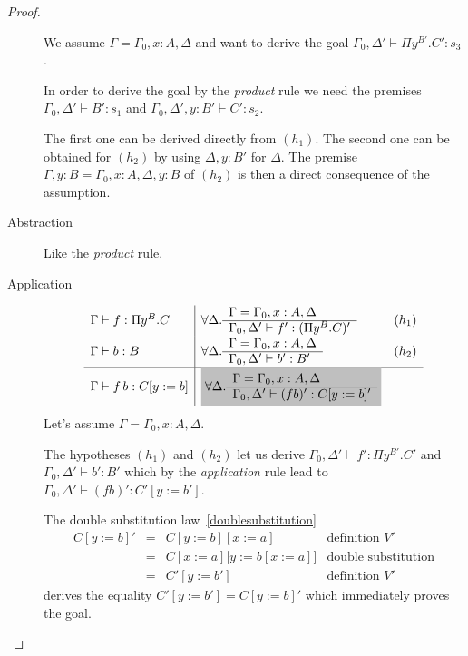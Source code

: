 \begin{theorem}
\begin{proof}
\begin{description}
      We assume $\Gamma = \Gamma_0,x:A,\Delta$ and want to derive the goal
      $\Gamma_0,\Delta' \vdash \Pi y^{B'}. C' : s_3$.

      In order to derive the goal by the \emph{product} rule we need the
      premises $\Gamma_0,\Delta' \vdash B': s_1$ and
      $\Gamma_0,\Delta',y:B' \vdash C': s_2$.

      The first one can be derived directly from $(h_1)$. The second one can
      be obtained for $(h_2)$ by using $\Delta,y:B'$ for $\Delta$. The premise
      $\Gamma,y:B = \Gamma_0,x:A,\Delta,y:B$ of $(h_2)$ is then a direct
      consequence of the assumption.

    \item[Abstraction] Like the \emph{product} rule.

    \item[Application]
      $$
      \begin{array}{l|ll}
        \Gamma\vdash f: \Pi y^B.C
        &\forall \Delta .
          \rulev
          {\Gamma = \Gamma_0,x:A,\Delta}
          {\Gamma_0,\Delta' \vdash f': (\Pi y^B.C)'} & (h_1)
        \\
        \Gamma \vdash b: B
        &\forall \Delta .
          \rulev
          {\Gamma = \Gamma_0,x:A,\Delta}
          {\Gamma_0,\Delta' \vdash b': B'} & (h_2)
        \\
        \hline %
        \Gamma \vdash f\, b : C[y:=b]
        & \goalbg{
          \forall \Delta .
          \rulev
          {\Gamma = \Gamma_0,x:A,\Delta}
          {\Gamma_0,\Delta' \vdash (f b)': C[y:=b]'}
          }
      \end{array}
      $$
      Let's assume $\Gamma = \Gamma_0,x:A,\Delta$.

      The hypotheses $(h_1)$ and $(h_2)$ let us derive
      $\Gamma_0,\Delta' \vdash f': \Pi y^{B'}.C'$ and
      $\Gamma_0,\Delta' \vdash b': B'$
      which by the \emph{application} rule lead to
      $\Gamma_0,\Delta' \vdash (f b)' : C'[y:=b']$.

      The double substitution law~\ref{doublesubstitution}
      $$
      \begin{array}{llll}
        C[y:=b]'
        & = & C[y:=b][x:=a]       & \text{definition } V'\\
        & = & C[x:=a]\big[y:=b[x:=a]\big] & \text{double substitution} \\
        & = & C'[y:=b']           & \text{definition } V'
      \end{array}
      $$
      derives the equality $C'[y:=b'] = C[y:=b]'$ which immediately proves the
      goal.


\end{description}
\end{proof}
\end{theorem}

